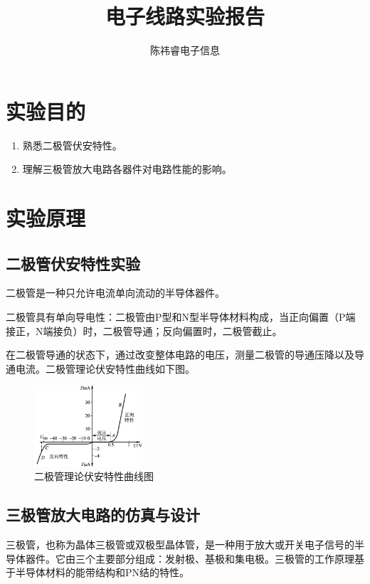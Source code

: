 \documentclass[]{article}
\title{电子线路实验报告}
\author{陈祎睿\quad 电子信息\quad 2023302121299}
\begin{document}
\maketitle


\section{实验目的}

\begin{enumerate}
	\item 熟悉二极管伏安特性。
	\item 理解三极管放大电路各器件对电路性能的影响。
\end{enumerate}


\section{实验原理}

\subsection{二极管伏安特性实验}
二极管是一种只允许电流单向流动的半导体器件。

二极管具有单向导电性：二极管由P型和N型半导体材料构成，当正向偏置（P端接正，N端接负）时，二极管导通；反向偏置时，二极管截止。

在二极管导通的状态下，通过改变整体电路的电压，测量二极管的导通压降以及导通电流。二极管理论伏安特性曲线如下图。

\begin{figure}[htbp]
	\centering
	\includegraphics[height=3cm]{img/2_1}
	\caption{二极管理论伏安特性曲线图}
\end{figure}

\subsection{三极管放大电路的仿真与设计}

三极管，也称为晶体三极管或双极型晶体管，是一种用于放大或开关电子信号的半导体器件。它由三个主要部分组成：发射极、基极和集电极。三极管的工作原理基于半导体材料的能带结构和PN结的特性。
\end{document}
